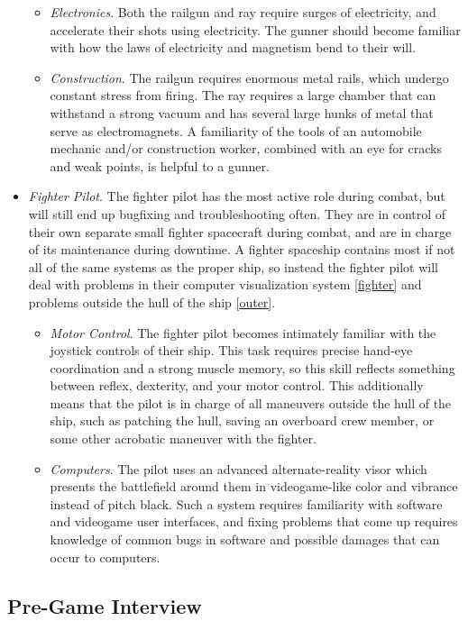 \documentclass[a4paper]{article}
\begin{document}
\begin{itemize}
\begin{itemize}
\item \textit{Electronics}. Both the railgun and ray require surges of electricity, and accelerate their shots using electricity. The gunner should become familiar with how the laws of electricity and magnetism bend to their will.
\item \textit{Construction}. The railgun requires enormous metal rails, which undergo constant stress from firing. The ray requires a large chamber that can withstand a strong vacuum and has several large hunks of metal that serve as electromagnets. A familiarity of the tools of an automobile mechanic and/or construction worker, combined with an eye for cracks and weak points, is helpful to a gunner.
\end{itemize}
\item \textit{Fighter Pilot}. The fighter pilot has the most active role during combat, but will still end up bugfixing and troubleshooting often. They are in control of their own separate small fighter spacecraft during combat, and are in charge of its maintenance during downtime. A fighter spaceship contains most if not all of the same systems as the proper ship, so instead the fighter pilot will deal with problems in their computer visualization system \ref{fighter} and problems outside the hull of the ship \ref{outer}. 
\begin{itemize}
\item \textit{Motor Control}. The fighter pilot becomes intimately familiar with the joystick controls of their ship. This task requires precise hand-eye coordination and a strong muscle memory, so this skill reflects something between reflex, dexterity, and your motor control. This additionally means that the pilot is in charge of all maneuvers outside the hull of the ship, such as patching the hull, saving an overboard crew member, or some other acrobatic maneuver with the fighter.
\item \textit{Computers}. The pilot uses an advanced alternate-reality visor which presents the battlefield around them in videogame-like color and vibrance instead of pitch black. Such a system requires familiarity with software and videogame user interfaces, and fixing problems that come up requires knowledge of common bugs in software and possible damages that can occur to computers.
\end{itemize}
\end{itemize}

\subsection{Pre-Game Interview} \label{interview}
\end{document}
